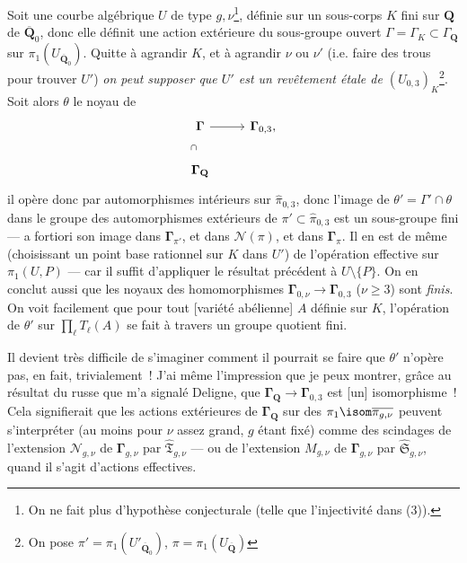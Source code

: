 Soit une courbe algébrique $U$ de type $g,\nu$\footnote{On ne fait plus d'hypothèse conjecturale (telle que l'injectivité dans (3)).}, définie sur un sous-corps $K$ fini sur $\mathbf{Q}$ de $\overline{\mathbf{Q}}_0$, donc elle définit une action extérieure du sous-groupe ouvert $\Gamma= \Gamma_K\subset \Gamma_\mathbf{Q}$ sur $\pi_1(U_{\overline{\mathbf{Q}}_0})$. Quitte à agrandir $K$, et à agrandir $\nu$ ou $\nu'$ (i.e. faire des trous pour trouver $U'$) \emph{on peut supposer que $U'$ est un revêtement étale de $(U_{0,3})_K$}\footnote{On pose $\pi'=\pi_1(U'_{\overline{\mathbf{Q}}_0})$, $\pi=\pi_1(U_{\overline{\mathbf{Q}}})$}. Soit alors $\theta$ le noyau de
\[
\begin{tikzcd}
	{\boldsymbol{\Gamma}} & {\boldsymbol{\Gamma}_{0, 3},} \\
	{\boldsymbol{\Gamma}_{\mathbf{Q}}}
	\arrow[from=1-1, to=1-2]
	\arrow[draw=none, "\cap" pos=0.5, from=2-1, to=1-1]
\end{tikzcd}
\]
il opère donc par automorphismes intérieurs sur $\hat{\pi}_{0,3}$, donc l'image de $\theta'=\Gamma'\cap\theta$ dans le groupe des automorphismes extérieurs de $\pi'\subset \hat{\pi}_{0,3}$ est un sous-groupe fini --- a fortiori son image dans $\boldsymbol{\Gamma}_{\pi'}$, et dans $\mathcal{N}(\pi)$, et dans $\boldsymbol{\Gamma}_\pi$. Il en est de même (choisissant un point base rationnel sur $K$ dans $U'$) de l'opération effective sur $\pi_1(U, P)$ --- car il suffit d'appliquer le résultat précédent à $U\setminus\{P\}$. On en conclut aussi que les noyaux des homomorphismes $\boldsymbol{\Gamma}_{0,\nu}\to\boldsymbol{\Gamma}_{0, 3}$ ($\nu\ge 3$) sont \emph{finis}. On voit facilement que pour tout [variété abélienne] $A$ définie sur $K$, l'opération de $\theta'$ sur $\prod_{\ell}T_\ell(A)$ se fait à travers un groupe quotient fini.

Il devient très difficile de s'imaginer comment il pourrait se faire que $\theta'$ n'opère pas, en fait, trivialement~! J'ai même l'impression que je peux montrer, grâce au résultat du russe que m'a signalé Deligne, que $\boldsymbol{\Gamma}_\mathbf{Q}\to\boldsymbol{\Gamma}_{0,3}$ est [un] isomorphisme~! Cela signifierait que les actions extérieures de $\boldsymbol{\Gamma}_\mathbf{Q}$ sur des $\pi_1 \isom \overline{\pi_{g,\nu}}$ peuvent s'interpréter (au moins pour $\nu$ assez grand, $g$ étant fixé) comme des scindages de l'extension $\mathcal{N}_{g,\nu}$ de $\boldsymbol{\Gamma}_{g,\nu}$ par $\hat{\mathfrak{T}}_{g,\nu}$ --- ou de l'extension $M_{g,\nu}$ de $\boldsymbol{\Gamma}_{g,\nu}$ par $\hat{\mathfrak{S}}_{g,\nu}$, quand il s'agit d'actions effectives.

